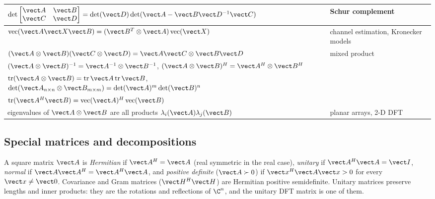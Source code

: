 \begin{table}[htbp]
\begin{tabular}{@{}ll@{}}
$\det\begin{bmatrix}\vect A&\vect B\\\vect C&\vect D\end{bmatrix}=\det(\vect D)\det(\vect A-\vect B\vect D^{-1}\vect C)$ & Schur complement\\
\midrule
$\operatorname{vec}(\vect A\vect X\vect B)=(\vect B^T\otimes\vect A)\operatorname{vec}(\vect X)$ & channel estimation, Kronecker models\\
$(\vect A\otimes\vect B)(\vect C\otimes\vect D)=\vect A\vect C\otimes\vect B\vect D$ & mixed product\\
$(\vect A\otimes\vect B)^{-1}=\vect A^{-1}\otimes\vect B^{-1}$,\; $(\vect A\otimes\vect B)^H=\vect A^H\otimes\vect B^H$ & \\
$\operatorname{tr}(\vect A\otimes\vect B)=\operatorname{tr}\vect A\operatorname{tr}\vect B$,\; $\det(\vect A_{n\times n}\otimes\vect B_{m\times m})=\det(\vect A)^m\det(\vect B)^n$ & \\
$\operatorname{tr}(\vect A^H\vect B)=\operatorname{vec}(\vect A)^H\operatorname{vec}(\vect B)$ & \\
eigenvalues of $\vect A\otimes\vect B$ are all products $\lambda_i(\vect A)\lambda_j(\vect B)$ & planar arrays, 2-D DFT\\
\bottomrule
\end{tabular}
\end{table}

\subsection{Special matrices and decompositions}

A square matrix $\vect A$ is \emph{Hermitian} if $\vect A^H=\vect A$ (real symmetric in the real
case), \emph{unitary} if $\vect A^H\vect A=\vect I$, \emph{normal} if $\vect A\vect A^H=\vect A^H\vect A$,
and \emph{positive definite} ($\vect A\succ0$) if $\vect x^H\vect A\vect x>0$ for every
$\vect x\ne\vect 0$. Covariance and Gram matrices ($\vect H^H\vect H$) are Hermitian positive
semidefinite. Unitary matrices preserve lengths and inner products: they are the rotations and
reflections of $\C^n$, and the unitary DFT matrix is one of them.


